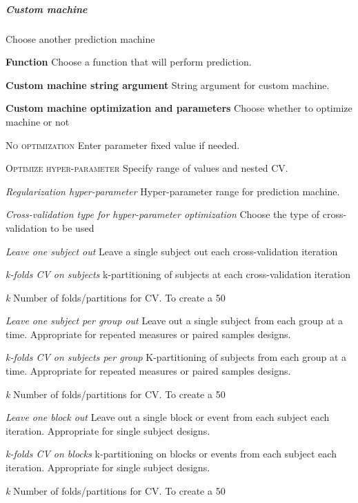 \subparagraph{Custom machine}
Choose another prediction machine


\textbf{Function}
Choose a function that will perform prediction.


\textbf{Custom machine string argument}
String argument for custom machine.


\textbf{Custom machine optimization and parameters}
Choose whether to optimize machine or not


\textsc{No optimization}
Enter parameter fixed value if needed.


\textsc{Optimize hyper-parameter}
Specify range of values and nested CV.


\textsl{Regularization hyper-parameter}
Hyper-parameter range for prediction machine.


\textsl{Cross-validation type for hyper-parameter optimization}
Choose the type of cross-validation to be used


\textit{Leave one subject out}
Leave a single subject out each cross-validation iteration


\textit{k-folds CV on subjects}
k-partitioning of subjects at each cross-validation iteration


\textit{k}
Number of folds/partitions for CV. To create a 50%


\textit{Leave one subject per group out}
Leave out a single subject from each group at a time. Appropriate for repeated measures or paired samples designs.


\textit{k-folds CV on subjects per group}
K-partitioning of subjects from each group at a time. Appropriate for repeated measures or paired samples designs.


\textit{k}
Number of folds/partitions for CV. To create a 50%


\textit{Leave one block out}
Leave out a single block or event from each subject each iteration. Appropriate for single subject designs.


\textit{k-folds CV on blocks}
k-partitioning on blocks or events from each subject each iteration. Appropriate for single subject designs.


\textit{k}
Number of folds/partitions for CV. To create a 50%


